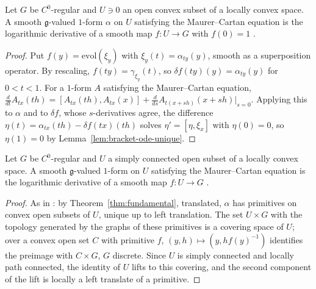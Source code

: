 \begin{theorem}
  \label{thm:fundamental}
  \leanok
  Let $G$ be $C^0$-regular and $U \ni 0$ an open convex subset of a locally convex space. A smooth
  $\mathfrak g$-valued $1$-form $\alpha$ on $U$ satisfying the Maurer--Cartan equation is the
  logarithmic derivative of a smooth map $f\colon U \to G$ with $f(0) = 1$
  \cite[Lemma 6.1.9]{GN26}.
\end{theorem}

\begin{proof}
  \leanok
  Put $f(y) = \mathrm{evol}(\xi_y)$ with $\xi_y(t) = \alpha_{ty}(y)$, smooth as a superposition
  operator. By rescaling, $f(ty) = \gamma_{\xi_y}(t)$, so $\delta f(ty)(y) = \alpha_{ty}(y)$ for
  $0 < t < 1$. For a $1$-form $A$ satisfying the Maurer--Cartan equation,
  $\frac{d}{dt} A_{tx}(th) = [A_{tx}(th), A_{tx}(x)] + \frac{d}{ds}A_{t(x+sh)}(x+sh)|_{s=0}$.
  Applying this to $\alpha$ and to $\delta f$, whose $s$-derivatives agree, the difference
  $\eta(t) = \alpha_{tx}(th) - \delta f(tx)(th)$ solves $\eta' = [\eta, \xi_x]$ with $\eta(0) = 0$,
  so $\eta(1) = 0$ by Lemma~\ref{lem:bracket-ode-unique}.
\end{proof}

\begin{theorem}
  \label{thm:fundamental-global}
  \leanok
  Let $G$ be $C^0$-regular and $U$ a simply connected open subset of a locally convex space. A
  smooth $\mathfrak g$-valued $1$-form on $U$ satisfying the Maurer--Cartan equation is the
  logarithmic derivative of a smooth map $f\colon U \to G$ \cite[Theorem 6.1.13]{GN26}.
\end{theorem}

\begin{proof}
  \leanok
  As in \cite[Proposition 6.1.10]{GN26}: by Theorem~\ref{thm:fundamental}, translated, $\alpha$
  has primitives on convex open subsets of $U$, unique up to left translation. The set $U \times G$
  with the topology generated by the graphs of these primitives is a covering space of $U$; over a
  convex open set $C$ with primitive $f$, $(y, h) \mapsto (y, h f(y)^{-1})$ identifies the preimage
  with $C \times G$, $G$ discrete. Since $U$ is simply connected and locally path connected, the
  identity of $U$ lifts to this covering, and the second component of the lift is locally a left
  translate of a primitive.
\end{proof}

